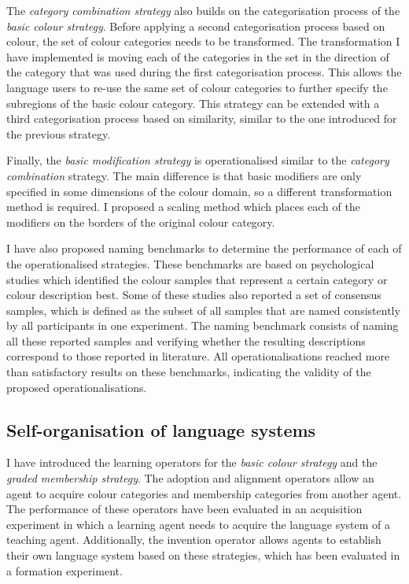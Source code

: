 The \emph{category combination strategy} also builds on the
categorisation process of the \emph{basic colour strategy}. Before
applying a second categorisation process based on colour, the set of
colour categories needs to be transformed. The transformation I have
implemented is moving each of the categories in the set in the
direction of the category that was used during the first
categorisation process. This allows the language users to re-use the
same set of colour categories to further specify the subregions of the
basic colour category. This strategy can be extended with a third
categorisation process based on similarity, similar to the one
introduced for the previous strategy.

Finally, the \emph{basic modification strategy} is
operationalised similar to the \emph{category combination}
strategy. The main difference is that basic modifiers are only
specified in some dimensions of the colour domain, so a different
transformation method is required. I proposed a scaling method which
places each of the modifiers on the borders of the original colour
category.

I have also proposed naming benchmarks to determine the performance of each
of the operationalised strategies. These benchmarks are based on
psychological studies which identified the colour samples that
represent a certain category or colour description best. Some of these
studies also reported a set of consensus samples, which is defined as
the subset of all samples that are named consistently by all
participants in one experiment. The naming benchmark consists of
naming all these reported samples and verifying whether the resulting
descriptions correspond to those reported in literature. All
operationalisations reached more than satisfactory results on these
benchmarks, indicating the validity of the proposed
operationalisations.

\subsection{Self-organisation of language systems}

I have introduced the learning operators for the \emph{basic colour
  strategy} and the \emph{graded membership strategy}. The adoption
and alignment operators allow an agent to acquire colour categories and
membership categories from another agent. The performance of these
operators have been evaluated in an acquisition experiment in which a
learning agent needs to acquire the language system of a teaching
agent. Additionally, the invention operator allows agents to establish
their own language system based on these strategies, which has been
evaluated in a formation experiment.


